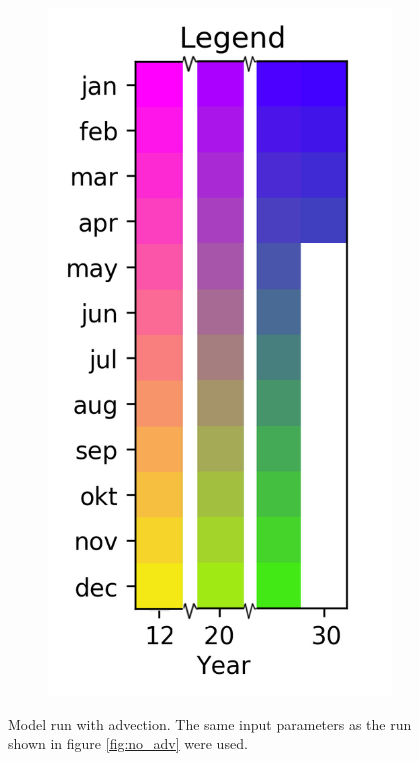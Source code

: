 \documentclass[twocolumn]{article}
\begin{document}
\begin{figure}
\begin{subfigure}[h]{0.20\textwidth}
\includegraphics[width=\textwidth,keepaspectratio]{12-30_reduced_legend.png}
\label{fig:}
\end{subfigure}\hfill
\caption{Model run with advection. The same input parameters as the run shown in figure \ref{fig:no_adv} were used.}
\label{fig:with_adv_geen_uitslag}
\end{figure}
\end{document}
